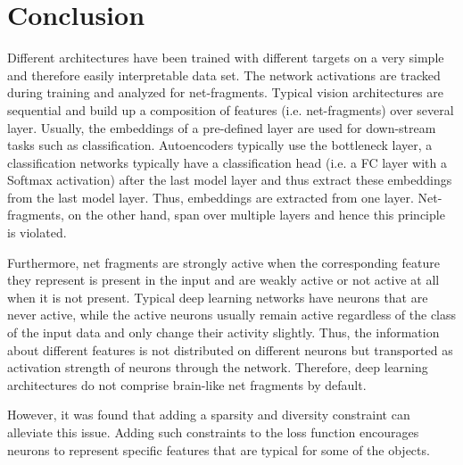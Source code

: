 \section{Conclusion}
Different architectures have been trained with different targets on a very simple and therefore easily interpretable data set.
The network activations are tracked during training and analyzed for net-fragments.
Typical vision architectures are sequential and build up a composition of features (i.e. net-fragments) over several layer.
Usually, the embeddings of a pre-defined layer are used for down-stream tasks such as classification.
Autoencoders typically use the bottleneck layer, a classification networks typically have a classification head (i.e. a FC layer with a Softmax activation) after the last model layer and thus extract these embeddings from the last model layer.
Thus, embeddings are extracted from one layer.
Net-fragments, on the other hand, span over multiple layers and hence this principle is violated.

Furthermore, net fragments are strongly active when the corresponding feature they represent is present in the input and are weakly active or not active at all when it is not present.
Typical deep learning networks have neurons that are never active, while the active neurons usually remain active regardless of the class of the input data and only change their activity slightly.
Thus, the information about different features is not distributed on different neurons but transported as activation strength of neurons through the network.
Therefore, deep learning architectures do not comprise brain-like net fragments by default.

However, it was found that adding a sparsity and diversity constraint can alleviate this issue.
Adding such constraints to the loss function encourages neurons to represent specific features that are typical for some of the objects.
